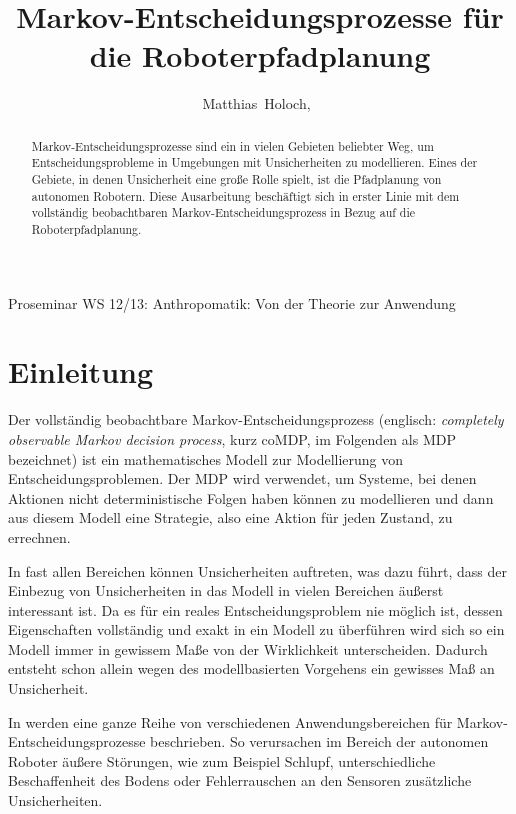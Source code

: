 \documentclass[a4paper]{IEEEtran}
\begin{document}
\title{Markov-Entscheidungsprozesse für die Roboterpfadplanung}

\author{Matthias~Holoch,~}%




%
{Proseminar WS 12/13: Anthropomatik: Von der Theorie zur Anwendung}



\maketitle


\begin{abstract}
Markov-Entscheidungsprozesse sind ein in vielen Gebieten beliebter Weg, um Entscheidungsprobleme in Umgebungen mit Unsicherheiten zu modellieren. Eines der Gebiete, in denen Unsicherheit eine große Rolle spielt, ist die Pfadplanung von autonomen Robotern. Diese Ausarbeitung beschäftigt sich in erster Linie mit dem vollständig beobachtbaren Markov-Entscheidungsprozess in Bezug auf die Roboterpfadplanung.
\end{abstract}


\section{Einleitung}
Der vollständig beobachtbare Markov-Entscheidungsprozess (englisch: \emph{completely observable Markov decision process}, kurz coMDP, im Folgenden als MDP bezeichnet) ist ein mathematisches Modell zur Modellierung von Entscheidungsproblemen. Der MDP wird verwendet, um Systeme, bei denen Aktionen nicht deterministische Folgen haben können zu modellieren und dann aus diesem Modell eine Strategie, also eine Aktion für jeden Zustand, zu errechnen.

In fast allen Bereichen können Unsicherheiten auftreten, was dazu führt, dass der Einbezug von Unsicherheiten in das Modell in vielen Bereichen äußerst interessant ist. Da es für ein reales Entscheidungsproblem nie möglich ist, dessen Eigenschaften vollständig und exakt in ein Modell zu überführen wird sich so ein Modell immer in gewissem Maße von der Wirklichkeit unterscheiden. Dadurch entsteht schon allein wegen des modellbasierten Vorgehens ein gewisses Maß an Unsicherheit.

In \cite{cassandra1998survey} werden eine ganze Reihe von verschiedenen Anwendungsbereichen für Markov-Entscheidungsprozesse beschrieben. So verursachen im Bereich der autonomen Roboter äußere Störungen, wie zum Beispiel Schlupf, unterschiedliche Beschaffenheit des Bodens oder Fehlerrauschen an den Sensoren zusätzliche Unsicherheiten.
\end{document}
